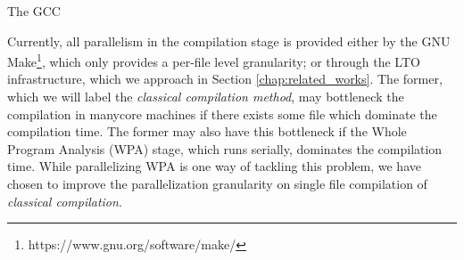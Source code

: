 \begin{section}{The GCC}



Currently, all parallelism in the compilation stage is provided either by the
GNU Make\footnote{https://www.gnu.org/software/make/}, which only provides a
per-file level granularity; or through the LTO infrastructure, which we
approach in Section \ref{chap:related_works}. The former, which we will label
the \textit{classical compilation method}, may bottleneck the compilation in
manycore machines if there exists some file which dominate the compilation time.
The former may also have this bottleneck if the Whole Program Analysis (WPA) stage,
which runs serially, dominates the compilation time. While parallelizing
WPA is one way of tackling this problem, we have chosen to improve the parallelization
granularity on single file compilation of \textit{classical compilation}.




\end{section}
